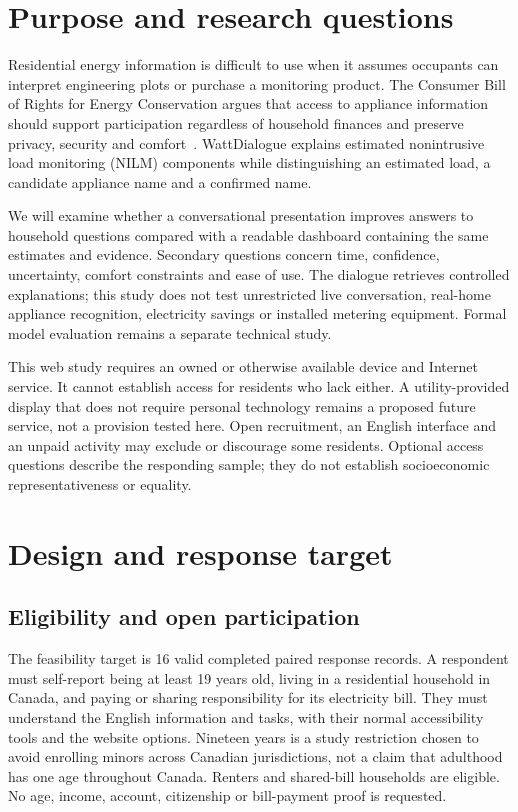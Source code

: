 \documentclass[11pt,letterpaper]{article}
\begin{document}
\newpage
\tableofcontents
\newpage
\section{Purpose and research questions}
Residential energy information is difficult to use when it assumes occupants can interpret engineering plots or purchase a monitoring product. The Consumer Bill of Rights for Energy Conservation argues that access to appliance information should support participation regardless of household finances and preserve privacy, security and comfort~\cite{rights}. WattDialogue explains estimated nonintrusive load monitoring (NILM) components while distinguishing an estimated load, a candidate appliance name and a confirmed name.

We will examine whether a conversational presentation improves answers to household questions compared with a readable dashboard containing the same estimates and evidence. Secondary questions concern time, confidence, uncertainty, comfort constraints and ease of use. The dialogue retrieves controlled explanations; this study does not test unrestricted live conversation, real-home appliance recognition, electricity savings or installed metering equipment. Formal model evaluation remains a separate technical study.

This web study requires an owned or otherwise available device and Internet service. It cannot establish access for residents who lack either. A utility-provided display that does not require personal technology remains a proposed future service, not a provision tested here. Open recruitment, an English interface and an unpaid activity may exclude or discourage some residents. Optional access questions describe the responding sample; they do not establish socioeconomic representativeness or equality.

\section{Design and response target}
\subsection{Eligibility and open participation}
The feasibility target is 16 valid completed paired response records. A respondent must self-report being at least 19 years old, living in a residential household in Canada, and paying or sharing responsibility for its electricity bill. They must understand the English information and tasks, with their normal accessibility tools and the website options. Nineteen years is a study restriction chosen to avoid enrolling minors across Canadian jurisdictions, not a claim that adulthood has one age throughout Canada. Renters and shared-bill households are eligible. No age, income, account, citizenship or bill-payment proof is requested.
\end{document}
